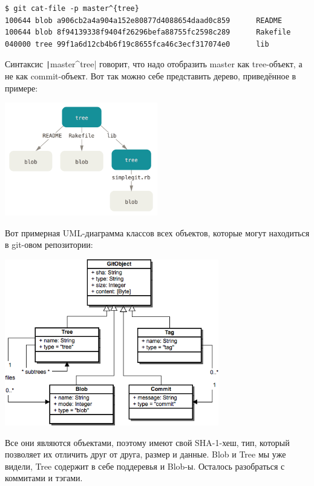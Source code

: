 \documentclass[a5paper]{article}
\begin{document}
\begin{verbatim}
$ git cat-file -p master^{tree}
100644 blob a906cb2a4a904a152e80877d4088654daad0c859      README
100644 blob 8f94139338f9404f26296befa88755fc2598c289      Rakefile
040000 tree 99f1a6d12cb4b6f19c8655fca46c3ecf317074e0      lib
\end{verbatim}

Синтаксис \texttt|master^{tree}| говорит, что надо отобразить master как tree-объект, а не как commit-объект. Вот так можно себе представить дерево, приведённое в примере:

\begin{center}
    \includegraphics[width=0.5\textwidth]{gitTreeObject.png}
\end{center}

Вот примерная UML-диаграмма классов всех объектов, которые могут находиться в git-овом репозитории:
\begin{center}
    \includegraphics[width=0.7\textwidth]{gitDataStructure.png}
\end{center}

Все они являются объектами, поэтому имеют свой SHA-1-хеш, тип, который позволяет их отличить друг от друга, размер и данные. Blob и Tree мы уже видели, Tree содержит в себе поддеревья и Blob-ы. Осталось разобраться с коммитами и тэгами. 
\end{document}
